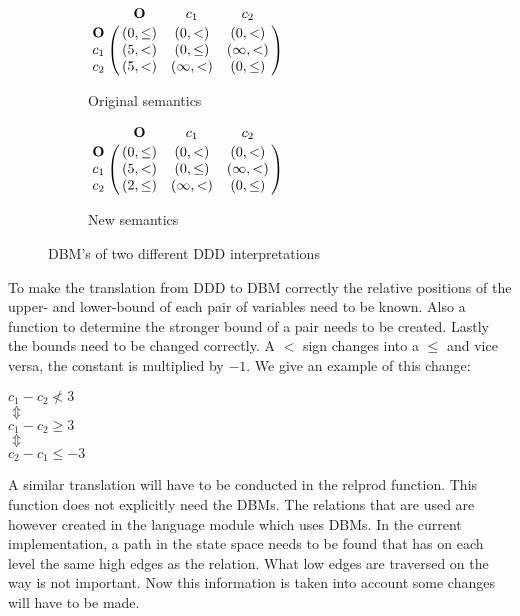 \begin{figure}[h]
	\centering
	\begin{subfigure}[l]{.5\linewidth}
	\centering
	\begin{math}
    \bordermatrix{ 	   & \mathbf{O}   & c_1           & c_2          \cr
 			\mathbf{O} &(0,\leq)      & (0,<)      & (0,<)     \cr
 			c_1        &(5,<)      & (0,\leq)      & (\infty,<)\cr
 			c_2        &(5,<)      & (\infty,<) & (0,\leq)     \cr}
	\end{math}
	\caption{Original semantics}
	\label{fig:dbm-original}
	\end{subfigure}
	
		\begin{subfigure}[r]{.5\linewidth}
	\centering
	\begin{math}
    \bordermatrix{ 	   & \mathbf{O}   & c_1           & c_2          \cr
 			\mathbf{O} &(0,\leq)      & (0,<)      & (0,<)     \cr
 			c_1        &(5,<)      & (0,\leq)      & (\infty,<)\cr
 			c_2        &(2,\leq)      & (\infty,<) & (0,\leq)     \cr}
	\end{math}
	\caption{New semantics}
	\label{fig:dbm-new}
	\end{subfigure}
\caption{DBM's of two different DDD interpretations}
\label{fig:dbm-versions}
\end{figure}

To make the translation from DDD to DBM correctly the relative positions of the upper- and lower-bound of each pair of variables need to be known. Also a function to determine the stronger bound of a pair needs to be created. Lastly the bounds need to be changed correctly. A $<$ sign changes into a $\leq$ and vice versa, the constant is multiplied by $-1$. We give an example of this change:
\begin{center}
$c_1 - c_2 \nless 3$\\
$\Updownarrow$\\
$c_1 - c_2 \geq 3$\\
$\Updownarrow$\\
$c_2 - c_1 \leq -3$
\end{center}

A similar translation will have to be conducted in the relprod function. This function does not explicitly need the DBMs. The relations that are used are however created in the language module which uses DBMs. In the current implementation, a path in the state space needs to be found that has on each level the same high edges as the relation. What low edges are traversed on the way is not important. Now this information is taken into account some changes will have to be made. 

